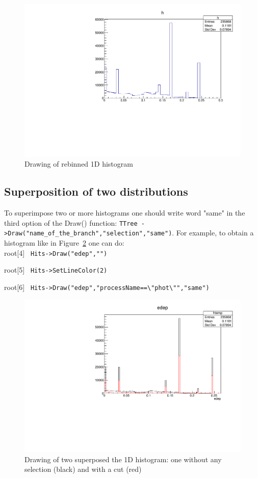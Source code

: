 \documentclass[12pt]{article}
\begin{document}
\begin{figure}[h]
\centering
\includegraphics[scale=0.5]{figs/1Drebinning.pdf}
\caption{Drawing of rebinned 1D histogram}
\label{fig:rebin}
\end{figure}


\clearpage
\subsection{Superposition of two distributions}
 To superimpose two or more histograms one should write word "same" in the third option of the Draw() function: \verb|TTree ->Draw("name_of_the_branch","selection","same")|. For example, to obtain a histogram like in Figure~\ref{fig:1Dhist_cut} one can do: \\

root[4] \verb| Hits->Draw("edep","") |

root[5] \verb| Hits->SetLineColor(2)|

root[6] \verb| Hits->Draw("edep","processName==\"phot\"","same") |\\

\begin{figure}[h]
\centering
\includegraphics[scale=0.5]{figs/1Dhist_cut.pdf}
\caption{Drawing of two superposed the 1D histogram: one without any selection (black) and with a cut (red)}
\label{fig:1Dhist_cut}
\end{figure}
\end{document}
